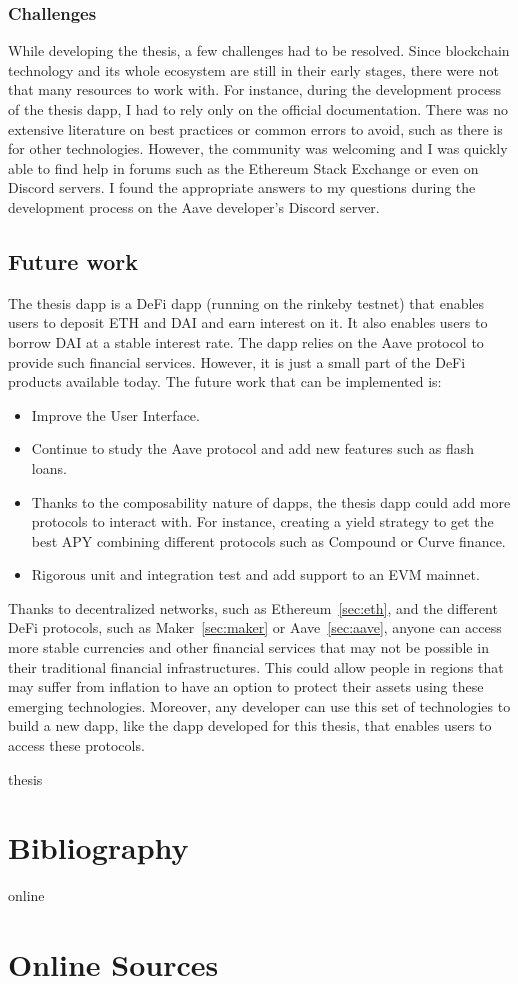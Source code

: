 \documentclass[11pt,a4paper]{report}
\begin{document}
\subsubsection{Challenges}
While developing the thesis, a few challenges had to be resolved. Since blockchain technology and its whole ecosystem are still in their early stages, there were not that many resources to work with. For instance, during the development process of the thesis dapp, I had to rely only on the official documentation. There was no extensive literature on best practices or common errors to avoid, such as there is for other technologies. However, the community was welcoming and I was quickly able to find help in forums such as the Ethereum Stack Exchange\cite{ethstack} or even on Discord\cite{discord} servers. I found the appropriate answers to my questions during the development process on the Aave developer's Discord server.
\subsection{Future work}
The thesis dapp is a DeFi dapp (running on the rinkeby testnet) that enables users to deposit ETH and DAI and earn interest on it. It also enables users to borrow DAI at a stable interest rate. The dapp relies on the Aave protocol to provide such financial services. However, it is just a small part of the DeFi products available today.  The future work that can be implemented is:
\begin{itemize}
	\item Improve the User Interface.
	\item Continue to study the Aave protocol and add new features such as flash loans\cite{flashloan}.
	\item Thanks to the composability nature of dapps, the thesis dapp could add more protocols to interact with. For instance, creating a yield strategy to get the best APY combining different protocols such as Compound\cite{compound} or Curve finance\cite{curve}.
	\item Rigorous unit and integration test and add support to an EVM mainnet.
\end{itemize}
Thanks to decentralized networks, such as Ethereum~\ref{sec:eth}, and the different DeFi protocols, such as Maker~\ref{sec:maker} or Aave~\ref{sec:aave}, anyone can access more stable currencies and other financial services that may not be possible in their traditional financial infrastructures. This could allow people in regions that may suffer from inflation to have an option to protect their assets using these emerging technologies. Moreover, any developer can use this set of technologies to build a new dapp, like the dapp developed for this thesis, that enables users to access these protocols.
\newpage

\begin{btSect}{thesis} %
\section*{Bibliography}
\btPrintCited
\end{btSect}
\begin{btSect}{online}
\section*{Online Sources}
\btPrintCited
\end{btSect}
\end{document}
